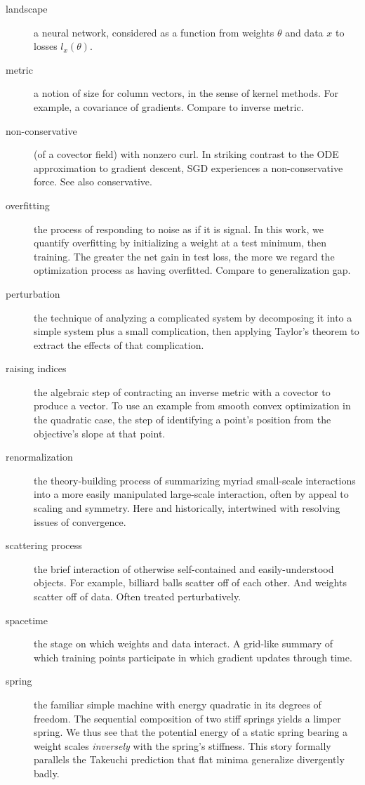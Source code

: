 \documentclass{article}
\theoremstyle{plain}
\theoremstyle{definition}
\begin{document}
\begin{description}
        \item[landscape] a neural network, considered as a function from weights $\theta$ and data $x$ to losses $l_x(\theta)$. 
        \item[metric] a notion of size for column vectors, in the sense of kernel methods.  For example, a covariance of gradients.  Compare to inverse metric.
        \item[non-conservative] (of a covector field) with nonzero curl.  In striking contrast to the ODE approximation to gradient descent, SGD experiences a non-conservative force.  See also conservative.
        \item[overfitting] the process of responding to noise as if it is signal.  In this work, we quantify overfitting by initializing a weight at a test minimum, then training.  The greater the net gain in test loss, the more we regard the optimization process as having overfitted.  Compare to generalization gap.
        \item[perturbation] the technique of analyzing a complicated system by decomposing it into a simple system plus a small complication, then applying Taylor's theorem to extract the effects of that complication.  
        \item[raising indices] the algebraic step of contracting an inverse metric with a covector to produce a vector.  To use an example from smooth convex optimization in the quadratic case, the step of identifying a point's position from the objective's slope at that point.
        \item[renormalization] the theory-building process of summarizing myriad small-scale interactions into a more easily manipulated large-scale interaction, often by appeal to scaling and symmetry.  Here and historically, intertwined with resolving issues of convergence.  
        \item[scattering process] the brief interaction of otherwise self-contained and easily-understood objects.  For example, billiard balls scatter off of each other.  And weights scatter off of data.  Often treated perturbatively. 
        \item[spacetime] the stage on which weights and data interact.  A grid-like summary of which training points participate in which gradient updates through time. 
        \item[spring] the familiar simple machine with energy quadratic in its degrees of freedom.  The sequential composition of two stiff springs yields a limper spring.  We thus see that the potential energy of a static spring bearing a weight scales \emph{inversely} with the spring's stiffness.  This story formally parallels the Takeuchi prediction that flat minima generalize divergently badly.

\end{description}
\end{document}
